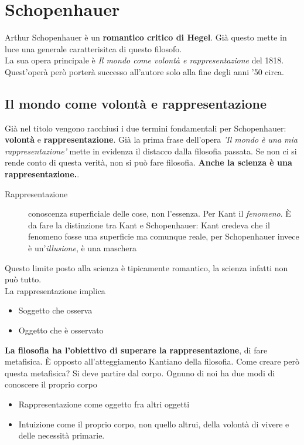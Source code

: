 
\section{Schopenhauer}

Arthur Schopenhauer è un \textbf{romantico critico di Hegel}. Già questo mette in luce una
generale caratterisitca di questo filosofo.\\
La sua opera principale è \textit{Il mondo come volontà e rappresentazione} del 1818. Quest'operà
però porterà successo all'autore solo alla fine degli anni '50 circa.

\subsection{Il mondo come volontà e rappresentazione}
Già nel titolo vengono racchiusi i due termini fondamentali per Schopenhauer: \textbf{volontà} e 
\textbf{rappresentazione}. Già la prima frase dell'opera \textit{'Il mondo è una mia 
rappresentazione'} mette in evidenza il distacco dalla filosofia passata. Se non ci si rende conto
di questa verità, non si può fare filosofia. \textbf{Anche la scienza è una rappresentazione.}.

\begin{description}
  \item[Rappresentazione] conoscenza superficiale delle cose, non l'essenza. Per Kant il 
    \textit{fenomeno}. È da fare la distinzione tra Kant e Schopenhauer: Kant credeva che il fenomeno
    fosse una superficie ma comunque reale, per Schopenhauer invece è un'\textit{illusione}, è una
    maschera
\end{description}

Questo limite posto alla scienza è tipicamente romantico, la scienza infatti non può tutto.\\
La rappresentazione implica
\begin{itemize}
  \item Soggetto che osserva
  \item Oggetto che è osservato
\end{itemize}
\textbf{La filosofia ha l'obiettivo di superare la rappresentazione}, di fare metafisica. È opposto
all'atteggiamento Kantiano della filosofia. Come creare però questa metafisica? Si deve partire dal
corpo. Ognuno di noi ha due modi di conoscere il proprio corpo
\begin{itemize}
  \item Rappresentazione come oggetto fra altri oggetti
  \item Intuizione come il proprio corpo, non quello altrui, della volontà di vivere e delle 
    necessità primarie.
\end{itemize}

